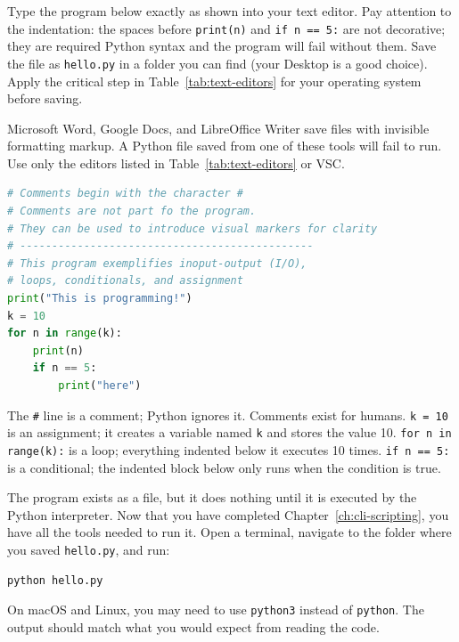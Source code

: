 \begin{infobox}[title=Exercise P-1: Your first Python program]
Type the program below exactly as shown into your text editor. Pay
attention to the indentation: the spaces before \texttt{print(n)} and
\texttt{if n == 5:} are not decorative; they are required Python syntax
and the program will fail without them. Save the file as
\texttt{hello.py} in a folder you can find (your Desktop is a good
choice). Apply the critical step in Table~\ref{tab:text-editors} for
your operating system before saving.

\begin{warningbox}[title=Word processors are not text editors]
Microsoft Word, Google Docs, and LibreOffice Writer save files with
invisible formatting markup. A Python file saved from one of these
tools will fail to run. Use only the editors listed in
Table~\ref{tab:text-editors} or VSC.
\end{warningbox}

\begin{lstlisting}[language=Python]
# Comments begin with the character #
# Comments are not part fo the program. 
# They can be used to introduce visual markers for clarity
# ----------------------------------------------
# This program exemplifies inoput-output (I/O), 
# loops, conditionals, and assignment
print("This is programming!")
k = 10
for n in range(k):
    print(n)
    if n == 5:
        print("here")
\end{lstlisting}

The \texttt{\#} line is a comment; Python ignores it. Comments exist
for humans. \texttt{k = 10} is an assignment; it creates a variable
named \texttt{k} and stores the value 10. \texttt{for n in range(k):}
is a loop; everything indented below it executes 10 times.
\texttt{if n == 5:} is a conditional; the indented block below only
runs when the condition is true.
\end{infobox}

The program exists as a file, but it does nothing until it is executed
by the Python interpreter. Now that you have completed
Chapter~\ref{ch:cli-scripting}, you have all the tools needed to run
it. Open a terminal, navigate to the folder where you saved
\texttt{hello.py}, and run:

\begin{verbatim}
python hello.py
\end{verbatim}

On macOS and Linux, you may need to use \texttt{python3} instead of
\texttt{python}. The output should match what you would expect from
reading the code.

